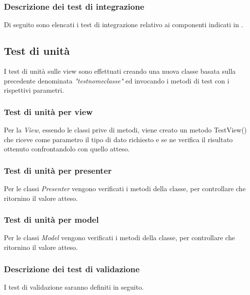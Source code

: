 \subsubsection{Descrizione dei test di integrazione}
Di seguito sono elencati i test di integrazione relativo ai componenti indicati in \infoST.

\subsection{Test di unità}
I test di unità sulle view sono effettuati creando una nuova classe basata sulla precedente denominata \textit{"testnomeclasse"} ed invocando i metodi di test con i rispettivi parametri.
\subsubsection{Test di unità per view}

Per la \textit{View}, essendo le classi prive di metodi, viene creato un metodo TestView() che riceve come parametro il tipo di dato richiesto e se ne verifica il risultato ottenuto confrontandolo con quello atteso.

\subsubsection{Test di unità per presenter}
Per le classi \textit{Presenter} vengono verificati i metodi della classe, per controllare che ritornino il valore atteso.

\subsubsection{Test di unità per model}
Per le classi \textit{Model} vengono verificati i metodi della classe, per controllare che ritornino il valore atteso.

\subsubsection{Descrizione dei test di validazione}
I test di validazione saranno definiti in seguito.



